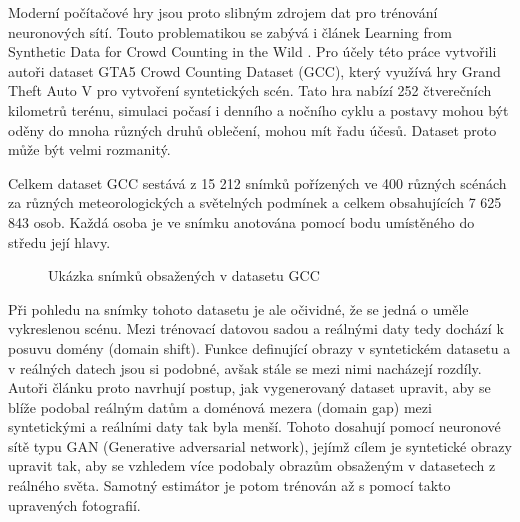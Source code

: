 Moderní počítačové hry jsou proto slibným zdrojem dat pro trénování neuronových sítí.
Touto problematikou se zabývá i článek Learning from Synthetic Data for Crowd Counting in the Wild \cite{GCC_dataset}. 
Pro účely této práce vytvořili autoři dataset GTA5 Crowd Counting Dataset (GCC), který využívá hry Grand Theft Auto V \cite{GTAV} pro vytvoření syntetických scén.
Tato hra nabízí 252 čtverečních kilometrů terénu, simulaci počasí i denního a nočního cyklu a postavy mohou být oděny do mnoha různých druhů oblečení, mohou mít řadu účesů.
Dataset proto může být velmi rozmanitý.

Celkem dataset GCC sestává z 15 212 snímků pořízených ve 400 různých scénách za různých meteorologických a světelných podmínek a celkem obsahujících 7 625 843 osob.
Každá osoba je ve snímku anotována pomocí bodu umístěného do středu její hlavy.

\begin{figure}[h!]
	\centering
	\caption{Ukázka snímků obsažených v datasetu GCC \cite{GCC_dataset}}
	\label{fig:GCC}
\end{figure}

Při pohledu na snímky tohoto datasetu je ale očividné, že se jedná o uměle vykreslenou scénu.
Mezi trénovací datovou sadou a reálnými daty tedy dochází k posuvu domény (domain shift).
Funkce definující obrazy v syntetickém datasetu a v reálných datech jsou si podobné, avšak stále se mezi nimi nacházejí rozdíly.
Autoři článku proto navrhují postup, jak vygenerovaný dataset upravit, aby se blíže podobal reálným datům a doménová mezera (domain gap) mezi syntetickými a reálními daty tak byla menší.
Tohoto dosahují pomocí neuronové sítě typu GAN (Generative adversarial network), jejímž cílem je syntetické obrazy upravit tak, aby se vzhledem více podobaly obrazům obsaženým v datasetech z reálného světa.
Samotný estimátor je potom trénován až s pomocí takto upravených fotografií.

